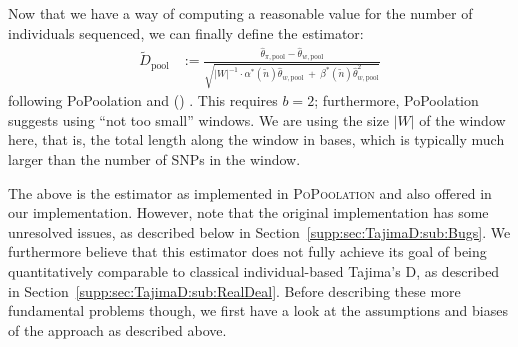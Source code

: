 \documentclass[letterpaper,fontsize=9pt,DIV=12]{scrartcl}
\newcounter{todo}
\newcommand\todo[1]{}
\newcommand\citeay[1]{\citeauthor{#1} (\citeyear{#1}) \cite{#1}}
\newcommand\toolname{\textsc}
\newcommand\secref[1]{Section~\ref{#1}}
\begin{document}
Now that we have a way of computing a reasonable value for the number of individuals sequenced,
we can finally define the estimator:
%
\begin{align}
    \tilde{D}_\text{pool} &:=
    \frac{
        \widehat{\theta}_{\pi, \text{pool}} - \widehat{\theta}_{w, \text{pool}}
            }{
        \sqrt{ {|W|}^{-1} \cdot \alpha^*(\tilde{n}) \widehat{\theta}_{w, \text{pool}} ~+~ \beta^*(\tilde{n}) \widehat{\theta}_{w, \text{pool}}^2 }
    }
\end{align}
%
following PoPoolation and \citeay{Achaz2008}.
This requires $b=2$; furthermore, PoPoolation suggests using ``not too small'' windows.
We are using the size $|W|$ of the window here, that is, the total length along the window in bases, which is typically much larger than the number of SNPs in the window. 

\todo{UNRESOLVED ISSUE: That is what i get from their code. Is that the correct term to use here? should it be the number of SNPs in the window instead?  JPS: I have no idea.  I would need to go through the Achaz paper in some detail to figure it out.  My guess is number of SNPs is right.}

The above is the estimator as implemented in \toolname{PoPoolation} and also offered in our implementation. However, note that the original implementation has some unresolved issues, as described below in \secref{supp:sec:TajimaD:sub:Bugs}. We furthermore believe that this estimator does not fully achieve its goal of being quantitatively comparable to classical individual-based Tajima's D, as described in \secref{supp:sec:TajimaD:sub:RealDeal}.
Before describing these more fundamental problems though, we first have a look at the assumptions and biases of the approach as described above.


\end{document}
